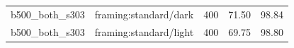 \begin{longtable}{l>{\raggedright\arraybackslash}p{.42\linewidth}rrr}
b500\_\allowbreak{}both\_\allowbreak{}s303 & %
framing:standard/dark & %
400 & %
71.50 & %
98.84 \\ %

b500\_\allowbreak{}both\_\allowbreak{}s303 & %
framing:standard/light & %
400 & %
69.75 & %
98.80 \\ %


\end{longtable}
